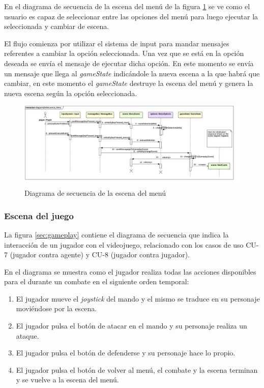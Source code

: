 En el diagrama de secuencia de la escena del menú de la figura \ref{sec:menu} se ve como el usuario es capaz de seleccionar entre las opciones del menú para luego ejecutar la seleccionada y cambiar de escena.

\bigskip

El flujo comienza por utilizar el sistema de input para mandar mensajes referentes a cambiar la opción seleccionada. Una vez que se está en la opción deseada se envía el mensaje de ejecutar dicha opción. En este momento se envía un mensaje que llega al \textit{gameState} indicándole la nueva escena a la que habrá que cambiar, en este momento el \textit{gameState} destruye la escena del menú y genera la nueva escena según la opción seleccionada.

\begin{landscape}
\begin{figure}
	\hspace*{-3cm}  
	\includegraphics[width=24cm]{otros/UML/png/alld/png/CasosDeUso__Especifico__Collaboration1__Interaction1__diagramaDeSecuencia_Menu_17.png}
	\caption{Diagrama de secuencia de la escena del menú}
	\label{sec:menu}
\end{figure}
\end{landscape}

\subsubsection*{Escena del juego}

La figura \ref{sec:gameplay} contiene el diagrama de secuencia que indica la interacción de un jugador con el videojuego, relacionado con los casos de uso CU-7 (jugador contra agente) y CU-8 (jugador contra jugador).

\bigskip

En el diagrama se muestra como el jugador realiza todas las acciones disponibles para el durante un combate en el siguiente orden temporal:

\begin{enumerate}
	\item El jugador mueve el \textit{joystick} del mando y el mismo se traduce en su personaje moviéndose por la escena.
	\item El jugador pulsa el botón de atacar en el mando y su personaje realiza un ataque.
	\item El jugador pulsa el botón de defenderse y su personaje hace lo propio.
	\item El jugador pulsa el botón de volver al menú, el combate y la escena terminan y se vuelve a la escena del menú.
\end{enumerate}

